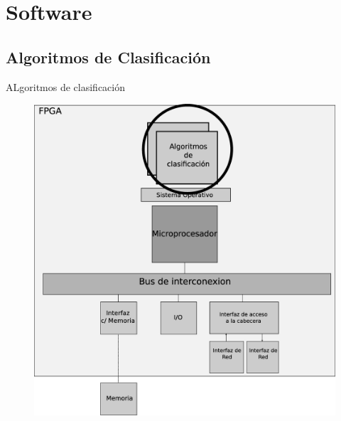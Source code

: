 \documentclass[xcolor=dvipsnames]{beamer}
\begin{document}
\section{Software}
\subsection{Algoritmos de Clasificación}
\begin{frame}{ALgoritmos de clasificación}
   	\begin{figure}
   		\centering
    		\includegraphics[scale=0.17]{figures/solucionsoft.eps}
    	\end{figure}
\end{frame}
\end{document}
